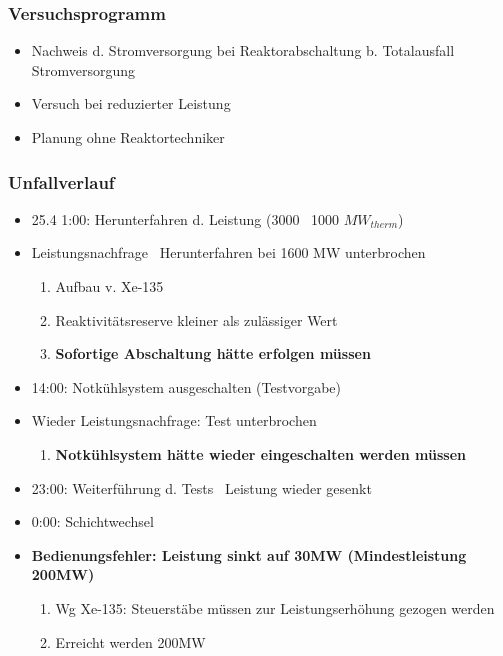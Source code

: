 \documentclass[12pt]{article}
\begin{document}
\subsubsection{Versuchsprogramm}
\begin{itemize}
	\item Nachweis d. Stromversorgung bei Reaktorabschaltung b. Totalausfall Stromversorgung
	\item Versuch bei reduzierter Leistung
	\item Planung ohne Reaktortechniker
\end{itemize}

\subsubsection{Unfallverlauf}
\begin{itemize}
	\item 25.4 1:00: Herunterfahren d. Leistung (3000 \textrightarrow\ 1000 \(MW_{therm}\))
	\item Leistungsnachfrage \textrightarrow\ Herunterfahren bei 1600 MW unterbrochen
		\begin{enumerate}[label = \textrightarrow]
			\item Aufbau v. Xe-135
			\item Reaktivitätsreserve kleiner als zulässiger Wert
			\item \textbf{Sofortige Abschaltung hätte erfolgen müssen}
		\end{enumerate}
	\item 14:00: Notkühlsystem ausgeschalten (Testvorgabe)
	\item Wieder Leistungsnachfrage: Test unterbrochen
		\begin{enumerate}[label = \textrightarrow]
			\item \textbf{Notkühlsystem hätte wieder eingeschalten werden müssen}
		\end{enumerate}
	\item 23:00: Weiterführung d. Tests \textrightarrow\ Leistung wieder gesenkt
	\item 0:00: Schichtwechsel
	\item \textbf{Bedienungsfehler: Leistung sinkt auf 30MW (Mindestleistung 200MW)}
		\begin{enumerate}[label = \textrightarrow]
			\item Wg Xe-135: Steuerstäbe müssen zur Leistungserhöhung gezogen werden
			\item Erreicht werden 200MW
		\end{enumerate}

\end{itemize}
\end{document}
